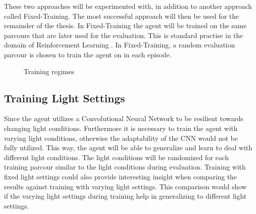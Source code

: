 These two approaches will be experimented with, in addition to another approach called Fixed-Training. The most successful approach will then be used for the remainder of the thesis. In Fixed-Training the agent will be trained on the same parcours that are later used for the evaluation. This is standard practise in the domain of Reinforcement Learning \autocite{rlbook2020}. In Fixed-Training, a random evaluation parcour is chosen to train the agent on in each episode.

\begin{figure}
     \centering
     \caption{Training regimes} 
     \label{fig:training_regimes}
\end{figure}


\subsection*{Training Light Settings}
Since the agent utilizes a Convolutional Neural Network to be resilient towards changing light conditions. Furthermore it is necessary to train the agent with varying light conditions, otherwise the adaptability of the CNN would not be fully utilized. This way, the agent will be able to generalize and learn to deal with different light conditions. The light conditions will be randomized for each training parcour similar to the light conditions during evaluation.
Training with fixed light settings could also provide interesting insight when comparing the results against training with varying light settings. This comparison would show if the varying light settings during training help in generalizing to different light settings.

